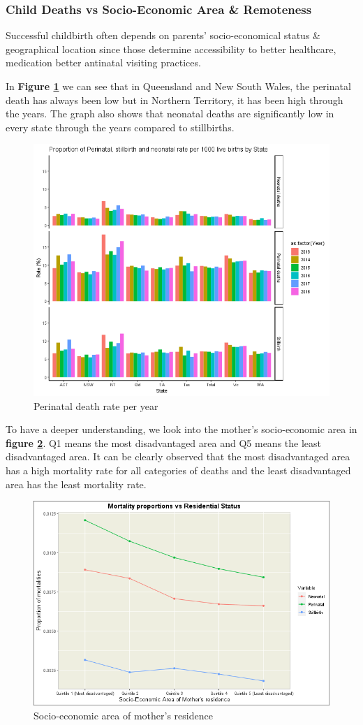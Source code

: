 \subsubsection{Child Deaths vs Socio-Economic Area \& Remoteness}
Successful childbirth often depends on parents' socio-economical status \& geographical location since those determine accessibility to better healthcare, medication better antinatal visiting practices.

In \textbf{Figure \ref{fig:peri_state}} we can see that in Queensland and New South Wales, the perinatal death has always been low but in Northern Territory, it has been high through the years. The graph also shows that neonatal deaths are significantly low in every state through the years compared to stillbirths.
\begin{figure}
  \centering
  \includegraphics[width=.75\textwidth]{subsections/perinatal_deaths/by_state_birth_baby_death.png}
  \caption{Perinatal death rate per year}
  \label{fig:peri_state}
\end{figure}

To have a deeper understanding, we look into the mother's socio-economic area in \textbf{figure \ref{fig:mother_res}}. Q1 means the most disadvantaged area and Q5 means the least disadvantaged area. It can be clearly observed that the most disadvantaged area has a high mortality rate for all categories of deaths and the least disadvantaged area has the least mortality rate.

\begin{figure}
  \centering
  \includegraphics[width=.75\textwidth]{img/aus/kanishka/mortality_residentialStat.png}
  \caption{Socio-economic area of mother's residence}
  \label{fig:mother_res}
\end{figure}

